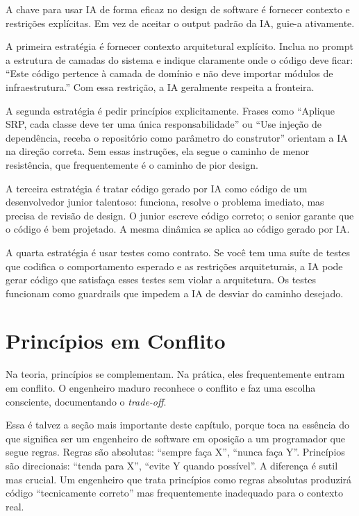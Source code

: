 A chave para usar IA de forma eficaz no design de software é fornecer
contexto e restrições explícitas. Em vez de aceitar o output padrão da IA,
guie-a ativamente.

A primeira estratégia é fornecer contexto arquitetural explícito. Inclua no
prompt a estrutura de camadas do sistema e indique claramente onde o código
deve ficar: ``Este código pertence à camada de domínio e não deve importar
módulos de infraestrutura.'' Com essa restrição, a IA geralmente respeita
a fronteira.

A segunda estratégia é pedir princípios explicitamente. Frases como ``Aplique
SRP, cada classe deve ter uma única responsabilidade'' ou ``Use injeção de
dependência, receba o repositório como parâmetro do construtor'' orientam
a IA na direção correta. Sem essas instruções, ela segue o caminho de menor
resistência, que frequentemente é o caminho de pior design.

A terceira estratégia é tratar código gerado por IA como código de um
desenvolvedor junior talentoso: funciona, resolve o problema imediato, mas
precisa de revisão de design. O junior escreve código correto; o senior
garante que o código é bem projetado. A mesma dinâmica se aplica ao código
gerado por IA.

A quarta estratégia é usar testes como contrato. Se você tem uma suíte de
testes que codifica o comportamento esperado e as restrições arquiteturais,
a IA pode gerar código que satisfaça esses testes sem violar a arquitetura.
Os testes funcionam como guardrails que impedem a IA de desviar do caminho
desejado.


\section{Princípios em Conflito}

Na teoria, princípios se complementam. Na prática, eles frequentemente entram em
conflito. O engenheiro maduro reconhece o conflito e faz uma escolha consciente,
documentando o \emph{trade-off}.

Essa é talvez a seção mais importante deste capítulo, porque toca na essência
do que significa ser um engenheiro de software em oposição a um programador que
segue regras. Regras são absolutas: ``sempre faça X'', ``nunca faça Y''.
Princípios são direcionais: ``tenda para X'', ``evite Y quando possível''.
A diferença é sutil mas crucial. Um engenheiro que trata princípios como regras
absolutas produzirá código ``tecnicamente correto'' mas frequentemente inadequado
para o contexto real.

